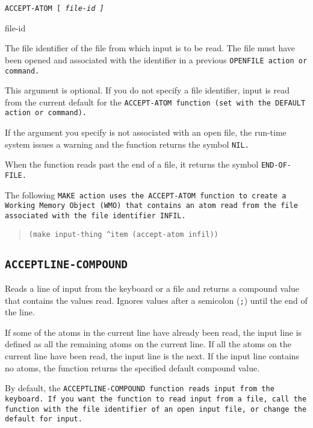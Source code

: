 \Format

\tt{ACCEPT-ATOM} [ \it{file-id} ]

\begin{arguments}
\item[file-id]

  The file identifier of the file from which input is to be read. The
  file must have been opened and associated with the identifier in a
  previous \tt{OPENFILE} action or command.

  This argument is optional. If you do not specify a file identifier,
  input is read from the current default for the \tt{ACCEPT-ATOM}
  function (set with the \tt{DEFAULT} action or command).
\end{arguments}

\ReturnValue

If the argument you specify is not associated with an open file, the
run-time system issues a warning and the function returns the symbol
\tt{NIL}.

When the function reads past the end of a file, it returns the symbol
\tt{END-OF-FILE}.

\Example

The following \tt{MAKE} action uses the \tt{ACCEPT-ATOM} function to
create a Working Memory Object (WMO) that contains an atom read from
the file associated with the file identifier \tt{INFIL}.

\begin{quote}
\begin{verbatim}
(make input-thing ^item (accept-atom infil))
\end{verbatim}
\end{quote}

\subsection{\tt{ACCEPTLINE-COMPOUND}}

Reads a line of input from the keyboard or a file and returns a
compound value that contains the values read. Ignores values after a
semicolon (\verb|;|) until the end of the line.

If some of the atoms in the current line have already been read, the
input line is defined as all the remaining atoms on the current
line. If all the atoms on the current line have been read, the input
line is the next. If the input line contains no atoms, the function
returns the specified default compound value.

By default, the \tt{ACCEPTLINE-COMPOUND} function reads input from the
keyboard. If you want the function to read input from a file, call the
function with the file identifier of an open input file, or change the
default for input.

